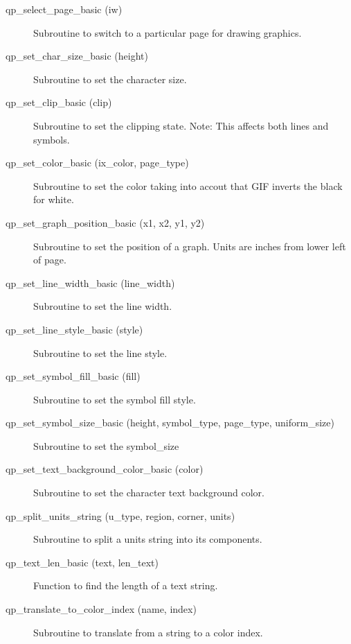 \begin{description}
\item[qp\_select\_page\_basic (iw)] \Newline 
Subroutine to switch to a particular page for drawing graphics.

\item[qp\_set\_char\_size\_basic (height)] \Newline 
Subroutine to set the character size.

\item[qp\_set\_clip\_basic (clip)] \Newline 
Subroutine to set the clipping state.
Note: This affects both lines and symbols.

\item[qp\_set\_color\_basic (ix\_color, page\_type)  ] \Newline 
Subroutine to set the color taking into accout that GIF
inverts the black for white.

\item[qp\_set\_graph\_position\_basic (x1, x2, y1, y2)] \Newline 
Subroutine to set the position of a graph.
Units are inches from lower left of page.

\item[qp\_set\_line\_width\_basic (line\_width)] \Newline 
Subroutine to set the line width.

\item[qp\_set\_line\_style\_basic (style)] \Newline 
Subroutine to set the line style.

\item[qp\_set\_symbol\_fill\_basic (fill)] \Newline 
Subroutine to set the symbol fill style.

\item[qp\_set\_symbol\_size\_basic (height, symbol\_type, page\_type, uniform\_size)] \Newline 
Subroutine to set the symbol\_size

\item[qp\_set\_text\_background\_color\_basic (color)] \Newline 
Subroutine to set the character text background color.

\item[qp\_split\_units\_string (u\_type, region, corner, units)] \Newline 
     Subroutine to split a units string into its components.

\item[qp\_text\_len\_basic (text, len\_text)] \Newline 
Function to find the length of a text string.

\item[qp\_translate\_to\_color\_index (name, index)] \Newline 
     Subroutine to translate from a string to a color index.

\end{description}

